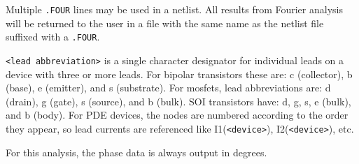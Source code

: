 \begin{Command}
\begin {Arguments}
\end{Arguments}

\comments
Multiple \texttt{.FOUR} lines may be used in a netlist.  All results from Fourier analysis will be 
returned to the user in a file with the same name as the netlist file suffixed with a \texttt{.FOUR}. 

\texttt{<lead abbreviation>} is a single character designator for individual
leads on a device with three or more leads.  For bipolar transistors these are:
c (collector), b (base), e (emitter), and s (substrate).  For mosfets, lead
abbreviations are: d (drain), g (gate), s (source), and b (bulk).  SOI
transistors have: d, g, s, e (bulk), and b (body).  For PDE devices, the nodes
are numbered according to the order they appear, so lead currents are
referenced like I1(\texttt{<device>}), I2(\texttt{<device>}), etc.

For this analysis, the phase data is always output in degrees.

\end{Command}

